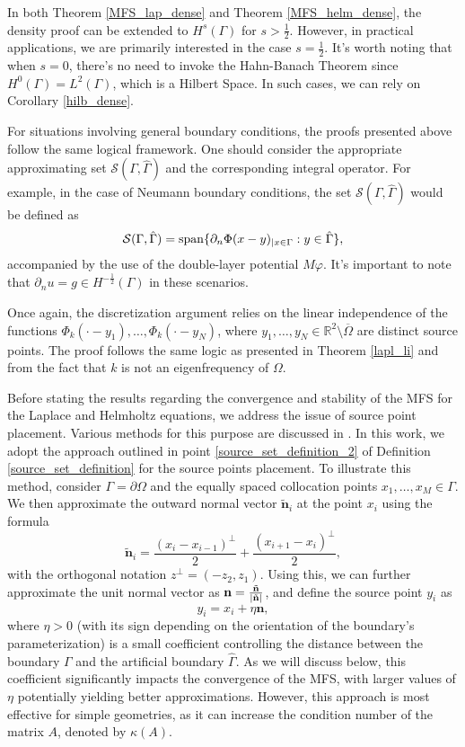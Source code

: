 \begin{remark}\label{density_remark_general_bc_and_hilbert}
    In both Theorem \ref{MFS_lap_dense} and Theorem \ref{MFS_helm_dense}, the density proof can be extended to \(H^s(\Gamma)\) for \(s > \frac{1}{2}\). However, in practical applications, we are primarily interested in the case \(s = \frac{1}{2}\). It's worth noting that when \(s = 0\), there's no need to invoke the Hahn-Banach Theorem since \(H^0(\Gamma) = L^2(\Gamma)\), which is a Hilbert Space. In such cases, we can rely on Corollary \ref{hilb_dense}. 

    For situations involving general boundary conditions, the proofs presented above follow the same logical framework. One should consider the appropriate approximating set \(\mathcal{S}(\Gamma, \hat{\Gamma})\) and the corresponding integral operator. For example, in the case of Neumann boundary conditions, the set \(\mathcal{S}(\Gamma, \hat{\Gamma})\) would be defined as
    \[
    \mathcal{S}(\Gamma, \hat{\Gamma}) = \operatorname{span}\{\partial_n \Phi(x-y)_{|x \in \Gamma} : y \in \hat{\Gamma}\},
    \]
    accompanied by the use of the double-layer potential \(M\varphi\). It's important to note that \(\partial_n u = g \in H^{-\frac{1}{2}}(\Gamma)\) in these scenarios.    
\end{remark}

Once again, the discretization argument relies on the linear independence of the functions \(\Phi_k(\cdot-y_1),\dots,\Phi_k(\cdot-y_N)\), where \(y_1,\dots,y_N \in \mathbb{R}^2\setminus\overline{\Omega}\) are distinct source points. The proof follows the same logic as presented in Theorem \ref{lapl_li} and from the fact that \(k\) is not an eigenfrequency of \(\Omega\).

Before stating the results regarding the convergence and stability of the \ac{MFS} for the Laplace and Helmholtz equations, we address the issue of source point placement. Various methods for this purpose are discussed in \cite{alves2009choice}. In this work, we adopt the approach outlined in point \ref{source_set_definition_2} of Definition \ref{source_set_definition} for the source points placement. To illustrate this method, consider \(\Gamma = \partial \Omega\) and the equally spaced collocation points \(x_1,\dots,x_M \in \Gamma\). We then approximate the outward normal vector \(\tilde{\mathbf{n}}_i\) at the point \(x_i\) using the formula
\[
    \tilde{\mathbf{n}}_i = \frac{(x_i - x_{i-1})^\perp }{2} + \frac{(x_{i+1}-x_i)^\perp }{2},
\]
with the orthogonal notation \(z^\perp = (-z_2,z_1)\). Using this, we can further approximate the unit normal vector as \(\mathbf{n} = \frac{\tilde{\mathbf{n}}}{\abs{\tilde{\mathbf{n}}}}\), and define the source point \(y_i\) as
\[
    y_i = x_i + \eta \mathbf{n},
\]
where \(\eta>0\) (with its sign depending on the orientation of the boundary's parameterization) is a small coefficient controlling the distance between the boundary \(\Gamma\) and the artificial boundary \(\hat{\Gamma}\). As we will discuss below, this coefficient significantly impacts the convergence of the \ac{MFS}, with larger values of \(\eta\) potentially yielding better approximations. However, this approach is most effective for simple geometries, as it can increase the condition number of the matrix \(A\), denoted by \(\kappa(A)\).


